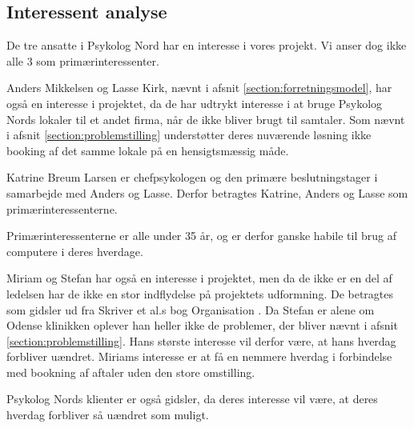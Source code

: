 \subsection{Interessent analyse}

De tre ansatte i Psykolog Nord har en interesse i vores projekt. Vi anser dog ikke alle 3 som primærinteressenter.

Anders Mikkelsen og Lasse Kirk, nævnt i afsnit \ref{section:forretningsmodel}, har også en interesse i projektet, da de har udtrykt interesse i at bruge Psykolog Nords lokaler til et andet firma, når de ikke bliver brugt til samtaler.
Som nævnt i afsnit \ref{section:problemstilling} understøtter deres nuværende løsning ikke booking af det samme lokale på en hensigtsmæssig måde.

Katrine Breum Larsen er chefpsykologen og den primære beslutningstager i samarbejde med Anders og Lasse.
Derfor betragtes Katrine, Anders og Lasse som primærinteressenterne.

Primærinteressenterne er alle under 35 år, og er derfor ganske habile til brug af computere i deres hverdage.

Miriam og Stefan har også en interesse i projektet, men da de ikke er en del af ledelsen har de ikke en stor indflydelse på projektets udformning.
De betragtes som gidsler ud fra Skriver et al.s bog Organisation \cite[s. 435]{interessentanalyse}.
Da Stefan er alene om Odense klinikken oplever han heller ikke de problemer, der bliver nævnt i afsnit \ref{section:problemstilling}.
Hans største interesse vil derfor være, at hans hverdag forbliver uændret.
Miriams interesse er at få en nemmere hverdag i forbindelse med bookning af aftaler uden den store omstilling.

Psykolog Nords klienter er også gidsler, da deres interesse vil være, at deres hverdag forbliver så uændret som muligt.